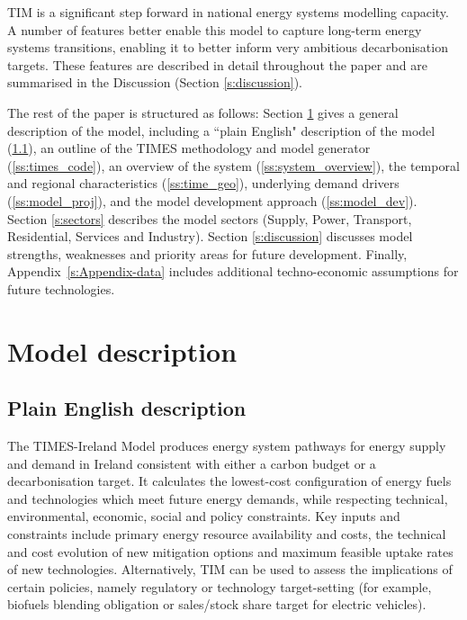 \documentclass[gmd,manuscript]{copernicus}
\begin{document}
TIM is a significant step forward in national energy systems modelling capacity. A number of features better enable this model to capture long-term energy systems transitions, enabling it to better inform very ambitious decarbonisation targets. These features are described in detail throughout the paper and are summarised in the Discussion (Section \ref{s:discussion}).


The rest of the paper is structured as follows: Section \ref{S:model_desc} gives a general description of the model, including a ``plain English" description of the model (\ref{ss:model_plain}), an outline of the TIMES methodology and model generator (\ref{ss:times_code}), an overview of the system (\ref{ss:system_overview}), the temporal and regional characteristics (\ref{ss:time_geo}), underlying demand drivers (\ref{ss:model_proj}), and the model development approach (\ref{ss:model_dev}). Section \ref{s:sectors} describes the model sectors (Supply, Power, Transport, Residential, Services and Industry). Section \ref{s:discussion} discusses model strengths, weaknesses and priority areas for future development. Finally, Appendix~\ref{s:Appendix-data} includes additional techno-economic assumptions for future technologies. 

\section{Model description}
\label{S:model_desc}

\subsection{Plain English description}
\label{ss:model_plain}
The TIMES-Ireland Model produces energy system pathways for energy supply and demand in Ireland consistent with either a carbon budget or a decarbonisation target. It calculates the lowest-cost configuration of energy fuels and technologies which meet future energy demands, while respecting technical, environmental, economic, social and policy constraints. Key inputs and constraints include primary energy resource availability and costs, the technical and cost evolution of new mitigation options and maximum feasible uptake rates of new technologies. Alternatively, TIM can be used to assess the implications of certain policies, namely regulatory or technology target-setting (for example, biofuels blending obligation or sales/stock share target for electric vehicles).
\end{document}
